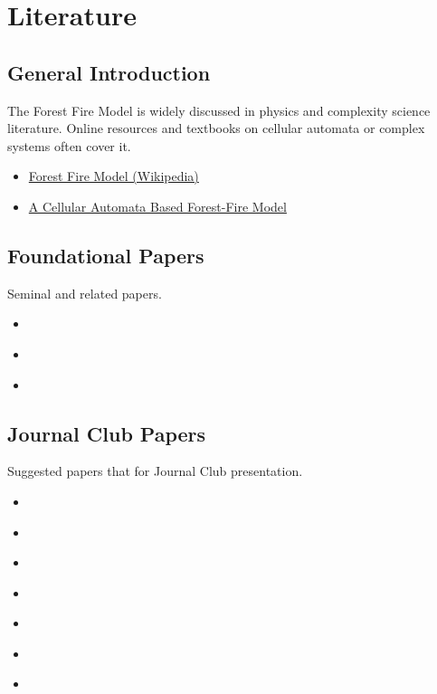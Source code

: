 \documentclass{article}
\begin{document}
\section{Literature}
\subsection{General Introduction}
The Forest Fire Model is widely discussed in physics and complexity science literature. Online resources and textbooks on cellular automata or complex systems often cover it.
\begin{itemize}
\item \href{https://en.wikipedia.org/wiki/Forest-fire_model}{Forest Fire Model (Wikipedia)}
\item \href{https://itp.uni-frankfurt.de/~gros/StudentProjects/Projects_2020/projekt_lars_dingeldein/}{A Cellular Automata Based Forest-Fire Model}
\end{itemize}

\subsection{Foundational Papers}
Seminal and related papers.
\begin{itemize}
    \item \textcite{ForestFire_Bak1990}
    \item \textcite{ForestFire_Chen1990}
    \item \textcite{ForestFire_Drossel1992}
\end{itemize}

\subsection{Journal Club Papers}
Suggested papers that for Journal Club presentation.
\begin{itemize}
    \item \textcite{ForestFire_Rui2017}
    \item \textcite{ForestFire_Zhou2025}
    \item \textcite{ForestFire_Zheng2017}
    \item \textcite{ForestFire_Mutthulakshmi2020}
    \item \textcite{ForestFire_Freire2019}
    \item \textcite{ForestFire_Alexandridis2008}
    \item \textcite{ForestFire_Mutthulakshmi2020}
\end{itemize}
\end{document}
